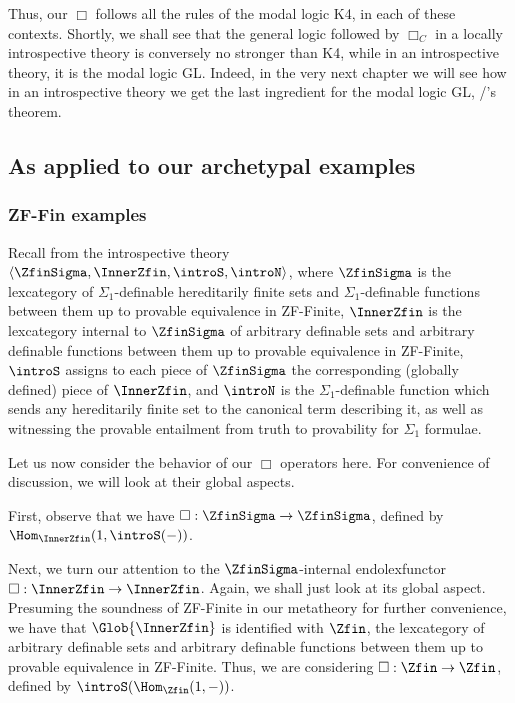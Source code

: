 Thus, our $\Box$ follows all the rules of the modal logic K4, in each of these contexts. Shortly, we shall see that the general logic followed by $\Box_C$ in a locally introspective theory is conversely no stronger than K4, while in an introspective theory, it is the modal logic GL. Indeed, in the very next chapter we will see how in an introspective theory we get the last ingredient for the modal logic GL, \Loeb/'s theorem.



\subsection{As applied to our archetypal examples}
\TODO

\subsubsection{ZF-Fin examples}
Recall from  the introspective theory $\langle \ZfinSigma, \InnerZfin, \introS, \introN \rangle$, where $\ZfinSigma$ is the lexcategory of $\Sigma_1$-definable hereditarily finite sets and $\Sigma_1$-definable functions between them up to provable equivalence in ZF-Finite, $\InnerZfin$ is the lexcategory internal to $\ZfinSigma$ of arbitrary definable sets and arbitrary definable functions between them up to provable equivalence in ZF-Finite, $\introS$ assigns to each piece of $\ZfinSigma$ the corresponding (globally defined) piece of $\InnerZfin$, and $\introN$ is the $\Sigma_1$-definable function which sends any hereditarily finite set to the canonical term describing it, as well as witnessing the provable entailment from truth to provability for $\Sigma_1$ formulae.

Let us now consider the behavior of our $\Box$ operators here. For convenience of discussion, we will look at their global aspects.

First, observe that we have $\Box : \ZfinSigma \to \ZfinSigma$, defined by $\Hom_{\InnerZfin}(1, \introS(-))$. \TODO

Next, we turn our attention to the $\ZfinSigma$-internal endolexfunctor $\Box : \InnerZfin \to \InnerZfin$. Again, we shall just look at its global aspect. Presuming the soundness of ZF-Finite in our metatheory for further convenience, we have that $\Glob{\InnerZfin}$ is identified with $\Zfin$, the lexcategory of arbitrary definable sets and arbitrary definable functions between them up to provable equivalence in ZF-Finite. Thus, we are considering $\Box : \Zfin \to \Zfin$, defined by $\introS(\Hom_{\Zfin}(1, -))$. \TODO

